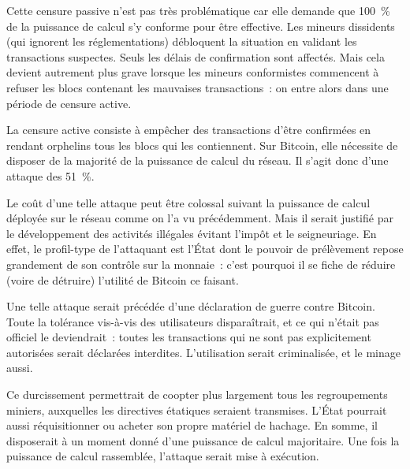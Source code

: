 Cette censure passive n'est pas très problématique car elle demande que 100~\% de la puissance de calcul s'y conforme pour être effective. Les mineurs dissidents (qui ignorent les réglementations) débloquent la situation en validant les transactions suspectes. Seuls les délais de confirmation sont affectés. Mais cela devient autrement plus grave lorsque les mineurs conformistes commencent à refuser les blocs contenant les mauvaises transactions~: on entre alors dans une période de censure active.

La censure active consiste à empêcher des transactions d'être confirmées en rendant orphelins tous les blocs qui les contiennent. Sur Bitcoin, elle nécessite de disposer de la majorité de la puissance de calcul du réseau. Il s'agit donc d'une attaque des 51~\%.

Le coût d'une telle attaque peut être colossal suivant la puissance de calcul déployée sur le réseau comme on l'a vu précédemment. Mais il serait justifié par le développement des activités illégales évitant l'impôt et le seigneuriage. En effet, le profil-type de l'attaquant est l'État dont le pouvoir de prélèvement repose grandement de son contrôle sur la monnaie~: c'est pourquoi il se fiche de réduire (voire de détruire) l'utilité de Bitcoin ce faisant.

Une telle attaque serait précédée d'une déclaration de guerre contre Bitcoin. Toute la tolérance vis-à-vis des utilisateurs disparaîtrait, et ce qui n'était pas officiel le deviendrait~: toutes les transactions qui ne sont pas explicitement autorisées serait déclarées interdites. L'utilisation serait criminalisée, et le minage aussi.


Ce durcissement permettrait de coopter plus largement tous les regroupements miniers, auxquelles les directives étatiques seraient transmises. L'État pourrait aussi réquisitionner ou acheter son propre matériel de hachage. En somme, il disposerait à un moment donné d'une puissance de calcul majoritaire. Une fois la puissance de calcul rassemblée, l'attaque serait mise à exécution.

